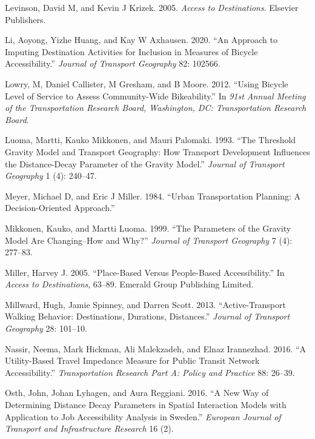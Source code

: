 \documentclass[preprint, 3p,
authoryear]{elsarticle} %
\newlength{\cslhangindent}
\newlength{\cslentryspacingunit} %
\newenvironment{CSLReferences}[2] %
 {%
  \setlength{\parindent}{0pt}
  \ifodd #1
  \let\oldpar\par
  \def\par{\hangindent=\cslhangindent\oldpar}
  \fi
  \setlength{\parskip}{#2\cslentryspacingunit}
 }%
 {}
\begin{document}
\begin{CSLReferences}{1}{0}
\leavevmode{}%
Levinson, David M, and Kevin J Krizek. 2005. \emph{Access to
Destinations}. Elsevier Publishers.

\leavevmode{}%
Li, Aoyong, Yizhe Huang, and Kay W Axhausen. 2020. {``An Approach to
Imputing Destination Activities for Inclusion in Measures of Bicycle
Accessibility.''} \emph{Journal of Transport Geography} 82: 102566.

\leavevmode{}%
Lowry, M, Daniel Callister, M Gresham, and B Moore. 2012. {``Using
Bicycle Level of Service to Assess Community-Wide Bikeability.''} In
\emph{91st Annual Meeting of the Transportation Research Board,
Washington, DC: Transportation Research Board}.

\leavevmode{}%
Luoma, Martti, Kauko Mikkonen, and Mauri Palomaki. 1993. {``The
Threshold Gravity Model and Transport Geography: How Transport
Development Influences the Distance-Decay Parameter of the Gravity
Model.''} \emph{Journal of Transport Geography} 1 (4): 240--47.

\leavevmode{}%
Meyer, Michael D, and Eric J Miller. 1984. {``Urban Transportation
Planning: A Decision-Oriented Approach.''}

\leavevmode{}%
Mikkonen, Kauko, and Martti Luoma. 1999. {``The Parameters of the
Gravity Model Are Changing--How and Why?''} \emph{Journal of Transport
Geography} 7 (4): 277--83.

\leavevmode{}%
Miller, Harvey J. 2005. {``Place-Based Versus People-Based
Accessibility.''} In \emph{Access to Destinations}, 63--89. Emerald
Group Publishing Limited.

\leavevmode{}%
Millward, Hugh, Jamie Spinney, and Darren Scott. 2013.
{``Active-Transport Walking Behavior: Destinations, Durations,
Distances.''} \emph{Journal of Transport Geography} 28: 101--10.

\leavevmode{}%
Nassir, Neema, Mark Hickman, Ali Malekzadeh, and Elnaz Irannezhad. 2016.
{``A Utility-Based Travel Impedance Measure for Public Transit Network
Accessibility.''} \emph{Transportation Research Part A: Policy and
Practice} 88: 26--39.

\leavevmode{}%
Osth, John, Johan Lyhagen, and Aura Reggiani. 2016. {``A New Way of
Determining Distance Decay Parameters in Spatial Interaction Models with
Application to Job Accessibility Analysis in Sweden.''} \emph{European
Journal of Transport and Infrastructure Research} 16 (2).


\end{CSLReferences}
\end{document}
